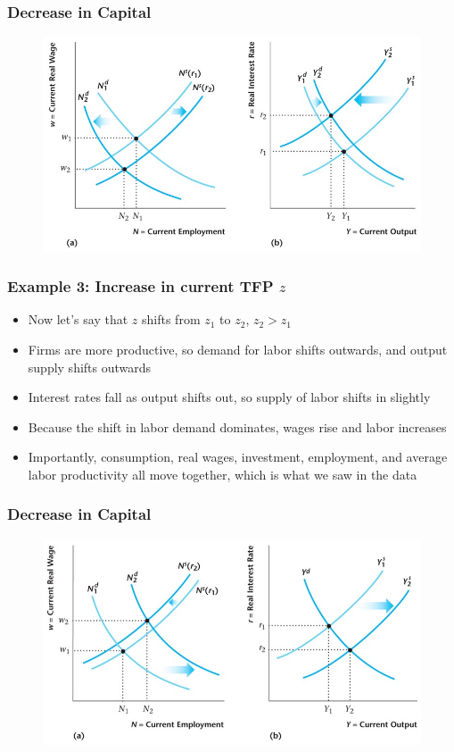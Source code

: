 \documentclass{beamer}
\begin{document}
\begin{frame} 
\frametitle[alignment=center]{Decrease in Capital} 
\begin{figure}
\centering
\includegraphics[scale=0.52]{Figures/W_Fig_11pt24.png}
\end{figure}
\end{frame}

\begin{frame}
\frametitle[alignment=center]{Example 3: Increase in current TFP $z$} 
\begin{itemize}
\item Now let's say that $z$ shifts from  $z_1$ to $z_2$, $z_2>z_1$
\bigskip
\item Firms are more productive, so demand for labor shifts outwards, and output supply shifts outwards
\bigskip
\item Interest rates fall as output shifts out, so supply of labor shifts in slightly
\bigskip
\item Because the shift in labor demand dominates, wages rise and labor increases
\bigskip
\item Importantly, consumption, real wages, investment, employment, and average labor productivity all move together, which is what we saw in the data
\end{itemize}
\end{frame}

\begin{frame} 
\frametitle[alignment=center]{Decrease in Capital} 
\begin{figure}
\centering
\includegraphics[scale=0.52]{Figures/W_Fig_11pt25.png}
\end{figure}
\end{frame}
\end{document}
